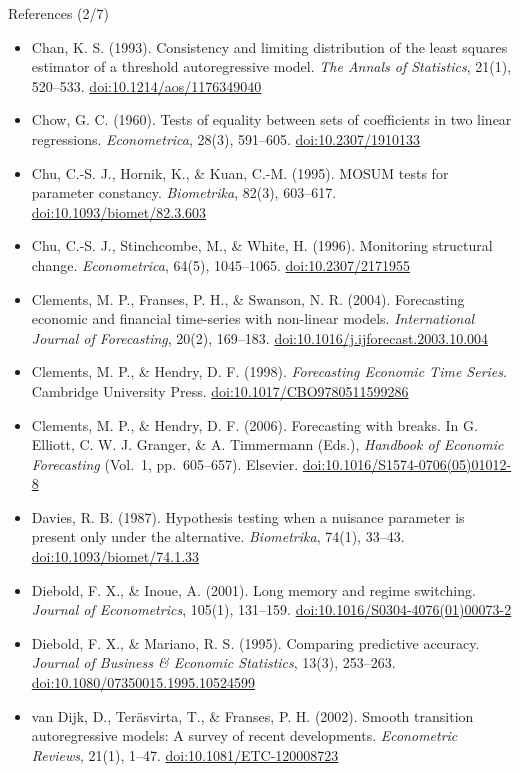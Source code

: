 \begin{frame}{References (2/7)}
\itemsize{\tiny}
\begin{itemize}
    \item Chan, K. S. (1993). Consistency and limiting distribution of the least squares estimator of a threshold autoregressive model. \textit{The Annals of Statistics}, 21(1), 520--533. \href{https://doi.org/10.1214/aos/1176349040}{doi:10.1214/aos/1176349040}
    \item Chow, G. C. (1960). Tests of equality between sets of coefficients in two linear regressions. \textit{Econometrica}, 28(3), 591--605. \href{https://doi.org/10.2307/1910133}{doi:10.2307/1910133}
    \item Chu, C.-S. J., Hornik, K., \& Kuan, C.-M. (1995). MOSUM tests for parameter constancy. \textit{Biometrika}, 82(3), 603--617. \href{https://doi.org/10.1093/biomet/82.3.603}{doi:10.1093/biomet/82.3.603}
    \item Chu, C.-S. J., Stinchcombe, M., \& White, H. (1996). Monitoring structural change. \textit{Econometrica}, 64(5), 1045--1065. \href{https://doi.org/10.2307/2171955}{doi:10.2307/2171955}
    \item Clements, M. P., Franses, P. H., \& Swanson, N. R. (2004). Forecasting economic and financial time-series with non-linear models. \textit{International Journal of Forecasting}, 20(2), 169--183. \href{https://doi.org/10.1016/j.ijforecast.2003.10.004}{doi:10.1016/j.ijforecast.2003.10.004}
    \item Clements, M. P., \& Hendry, D. F. (1998). \textit{Forecasting Economic Time Series}. Cambridge University Press. \href{https://doi.org/10.1017/CBO9780511599286}{doi:10.1017/CBO9780511599286}
    \item Clements, M. P., \& Hendry, D. F. (2006). Forecasting with breaks. In G. Elliott, C. W. J. Granger, \& A. Timmermann (Eds.), \textit{Handbook of Economic Forecasting} (Vol.\ 1, pp.\ 605--657). Elsevier. \href{https://doi.org/10.1016/S1574-0706(05)01012-8}{doi:10.1016/S1574-0706(05)01012-8}
    \item Davies, R. B. (1987). Hypothesis testing when a nuisance parameter is present only under the alternative. \textit{Biometrika}, 74(1), 33--43. \href{https://doi.org/10.1093/biomet/74.1.33}{doi:10.1093/biomet/74.1.33}
    \item Diebold, F. X., \& Inoue, A. (2001). Long memory and regime switching. \textit{Journal of Econometrics}, 105(1), 131--159. \href{https://doi.org/10.1016/S0304-4076(01)00073-2}{doi:10.1016/S0304-4076(01)00073-2}
    \item Diebold, F. X., \& Mariano, R. S. (1995). Comparing predictive accuracy. \textit{Journal of Business \& Economic Statistics}, 13(3), 253--263. \href{https://doi.org/10.1080/07350015.1995.10524599}{doi:10.1080/07350015.1995.10524599}
    \item van Dijk, D., Teräsvirta, T., \& Franses, P. H. (2002). Smooth transition autoregressive models: A survey of recent developments. \textit{Econometric Reviews}, 21(1), 1--47. \href{https://doi.org/10.1081/ETC-120008723}{doi:10.1081/ETC-120008723}
\end{itemize}
\end{frame}

